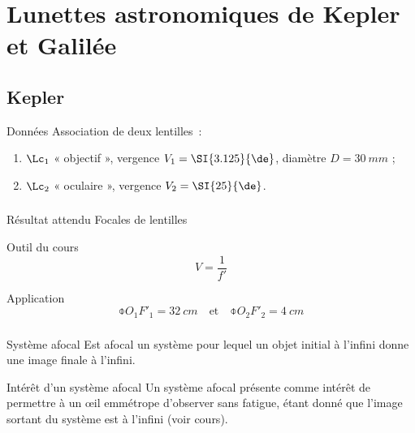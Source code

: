 \documentclass[a4paper, 12pt, final, garamond]{book}
\begin{document}
\section{Lunettes astronomiques de Kepler et Galilée}
\subsection{Kepler}

\begin{center}
    \begin{NCdefi}[width=.8\linewidth]{Données}
    Association de deux lentilles~:
    \begin{enumerate}
        \item $\Lc_1$ « objectif », vergence $V_1 = \SI{3.125}{\de}$, diamètre $D
            = \SI{30}{mm}$ ;
        \item $\Lc_2$ « oculaire », vergence $V_2 = \SI{25}{\de}$.
    \end{enumerate}
\end{NCdefi}
\end{center}

\subsubsection{}

\begin{tcbraster}[raster columns=7, raster equal height=rows]
    \begin{NCprop}[raster multicolumn=2]{Résultat attendu}
        Focales de lentilles
    \end{NCprop}
    \begin{NCrapp}[raster multicolumn=2]{Outil du cours}
        $$V = \dfrac{1}{f'}$$
    \end{NCrapp}
    \begin{NCexem}[raster multicolumn=3, valign=top]{Application}
        \[ \boxed{\obar{O_1F'_1} = \SI{32}{cm}} \quad\text{et}\quad
        \boxed{\obar{O_2F'_2} = \SI{4}{cm}} \]
    \end{NCexem}
\end{tcbraster}

\subsubsection{}
\begin{tcbraster}[raster columns=2, raster equal height=rows]
    \begin{defi}{Système afocal}
        Est afocal un système pour lequel un objet initial à l'infini donne une
        image finale à l'infini.
    \end{defi}
    \begin{inte}{Intérêt d'un système afocal}
        Un système afocal présente comme intérêt de permettre à un œil emmétrope
        d'observer sans fatigue, étant donné que l'image sortant du système est à
        l'infini (voir cours).
    \end{inte}
\end{tcbraster}
\end{document}
